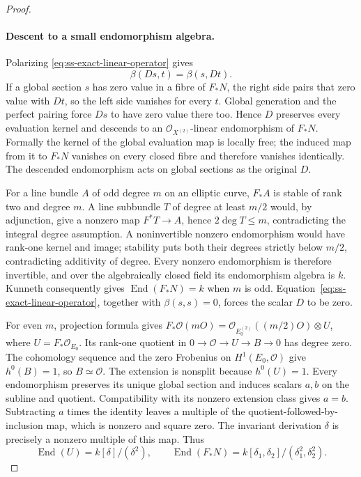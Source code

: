 \begin{proof}
\paragraph{Descent to a small endomorphism algebra.}
Polarizing \eqref{eq:ss-exact-linear-operator} gives
\[
                   \beta(Ds,t)=\beta(s,Dt).
\]
If a global section $s$ has zero value in a fibre of $F_*N$,
the right side pairs that zero value with $Dt$, so the left
side vanishes for every $t$. Global generation and the perfect
pairing force $Ds$ to have zero value there too.
Hence $D$ preserves every evaluation kernel and descends to an
$\mathcal O_{X^{(2)}}$-linear endomorphism of $F_*N$.
Formally the kernel of the global evaluation map is locally free;
the induced map from it to $F_*N$ vanishes on every closed fibre
and therefore vanishes identically. The descended endomorphism
acts on global sections as the original $D$.

For a line bundle $A$ of odd degree $m$ on an elliptic curve,
$F_*A$ is stable of rank two and degree $m$.
A line subbundle $T$ of degree at least $m/2$ would, by adjunction,
give a nonzero map $F^*T\to A$, hence $2\deg T\le m$,
contradicting the integral degree assumption. A noninvertible
nonzero endomorphism would have rank-one kernel and image; stability
puts both their degrees strictly below $m/2$, contradicting
additivity of degree. Every nonzero endomorphism is therefore
invertible, and over the algebraically closed field its endomorphism
algebra is $k$. Kunneth consequently gives
$\operatorname{End}(F_*N)=k$ when $m$ is odd.
Equation~\eqref{eq:ss-exact-linear-operator}, together with
$\beta(s,s)=0$, forces the scalar $D$ to be zero.

For even $m$, projection formula gives
$F_*\mathcal O(mO)=\mathcal O_{E_0^{(2)}}((m/2)O)\otimes U$,
where $U=F_*\mathcal O_{E_0}$. Its rank-one quotient in
$0\to\mathcal O\to U\to B\to0$ has degree zero. The cohomology
sequence and the zero Frobenius on $H^1(E_0,\mathcal O)$ give
$h^0(B)=1$, so $B\simeq\mathcal O$.
The extension is nonsplit because $h^0(U)=1$.
Every endomorphism preserves its unique global section and induces
scalars $a,b$ on the subline and quotient. Compatibility with its
nonzero extension class gives $a=b$. Subtracting $a$ times the
identity leaves a multiple of the quotient-followed-by-inclusion
map, which is nonzero and square zero. The invariant derivation
$\delta$ is precisely a nonzero multiple of this map. Thus
\[
 \operatorname{End}(U)=k[\delta]/(\delta^2),\qquad
 \operatorname{End}(F_*N)
       =k[\delta_1,\delta_2]/(\delta_1^2,\delta_2^2).
\]


\end{proof}
